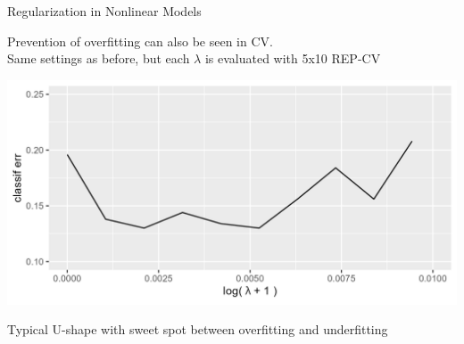 \documentclass[11pt,compress,t,notes=noshow, xcolor=table]{beamer}
\begin{document}
\begin{frame}{Regularization in Nonlinear Models}

Prevention of overfitting can also be seen in CV.\\
Same settings as before, but each $\lambda$ is evaluated with
5x10 REP-CV

\begin{center}\includegraphics[width=1\textwidth]{figure/classifi_nn_err_decay.png}\end{center}

Typical U-shape with sweet spot between overfitting and underfitting
\end{frame}
\end{document}
